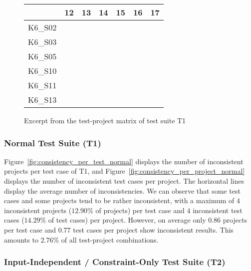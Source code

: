 \begin{figure}[htpb]
    \centering

    \setlength{\tabcolsep}{0.2em}
    \tiny
    \begin{tabular}{l|rrrrrr}
        \toprule
                & 12 & 13 & 14 & 15 & 16 & 17 \\
        \midrule
        K6\_S02 & \y & \x & \y & \y & \y & \y \\
        K6\_S03 & \y & \x & \y & \y & \y & \y \\
        K6\_S05 & \y & \y & \y & \y & \y & \y \\
        K6\_S10 & \y & \x & \x & \y & \y & \y \\
        K6\_S11 & \y & \y & \y & \y & \y & \y \\
        K6\_S13 & \y & \y & \y & \y & \y & \y \\
        \bottomrule
    \end{tabular}
    \setlength{\tabcolsep}{\defaulttabcolsep}

    \caption{Excerpt from the test-project matrix of test suite T1}
    \label{tab:inconsistency_matrices_excerpt}
\end{figure}

\subsubsection{Normal Test Suite (T1)}

\noindent Figure~\ref{fig:consistency_per_test_normal} displays the number of inconsistent projects per test case of T1,
and Figure~\ref{fig:consistency_per_project_normal} displays the number of inconsistent test cases per project.
The horizontal lines display the average number of inconsistencies.
We can observe that some test cases and some projects tend to be rather inconsistent,
with a maximum of $4$ inconsistent projects ($12.90\%$ of projects) per test case and $4$ inconsistent test cases ($14.29\%$ of test cases) per project.
However, on average only $0.86$ projects per test case and $0.77$ test cases per project show inconsistent results.
This amounts to $2.76\%$ of all test-project combinations.

\subsubsection{Input-Independent / Constraint-Only Test Suite (T2)}

